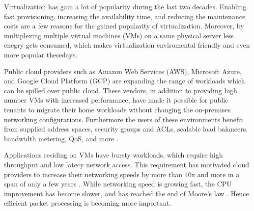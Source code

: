 


Virtualization has gain a lot of popularity during the last two decades. Enabling fast 
provisioning, increasing the availability time, and reducing the maintenance costs
are a few reasons for the gained popularity of virtualization. Moreover, by multiplexing 
multiple virtual machines (VMs) on a same physical server less enegry gets consumed, 
which makes virtualization enviromental friendly and even more popular thesedays.

Public cloud providers such as Amazon Web Services (AWS), Microsoft Azure, and Google Cloud
Platform (GCP) are expanding the range of workloads which can be spilled over public cloud. 
These  vendors, in addition to providing high number VMs with increased performance, have made 
it possible for public tenants to migrate their home workloads without changing the 
on-premises networking configurations. Furthermore the users of these environments
benefit from supplied address spaces, security groups and ACLs, scalable load balancers, 
bandwidth metering, QoS, and more \cite{firestone2017vfp}.


Applications residing on VMs have bursty workloads, which require high throughput and low latecy 
network access. This requirement has motivated cloud providers to increase their networking 
speeds by more than 40x and more in a span of only a few years \cite{firestone2018azure}. While 
networking speed is growing fast, the CPU improvement has become slower, and has reached the 
end of Moore's law \cite{esmaeilzadeh2011dark}. Hence efficient packet processing is becoming 
more important. 
















